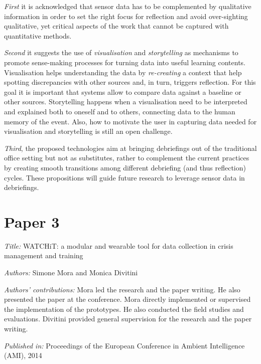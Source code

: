 \emph{First} it is acknowledged that sensor data has to be complemented by qualitative information in order to set the right focus for reflection and avoid over-sighting qualitative, yet critical aspects of the work that cannot be captured with quantitative methods.

\emph{Second} it suggests the use of \emph{visualisation} and \emph{storytelling} as mechanisms to promote sense-making processes for turning data into useful learning contents. Visualisation helps understanding the data by \emph{re-creating} a context that help spotting discrepancies with other sources and, in turn, triggers reflection. For this goal it is important that systems allow to compare data against a baseline or other sources. Storytelling happens when a visualisation need to be interpreted and explained both to oneself and to others, connecting data to the human memory of the event. Also, how to motivate the user in capturing data needed for visualisation and storytelling is still an open challenge.

\emph{Third}, the proposed technologies aim at bringing debriefings out of the traditional office setting but not as substitutes, rather to complement the current practices by creating smooth transitions among different debriefing (and thus reflection) cycles. These propositions will guide future research to leverage sensor data in debriefings.


\section[P3: WATCHiT: a modular and wearable tool for data collection in crisis management and training]{Paper 3}\label{paper-3}

\emph{Title:} WATCHiT: a modular and wearable tool for data collection in crisis management and training

\emph{Authors:} Simone Mora and Monica Divitini

\emph{Authors' contributions:} Mora led the research and the paper writing. He also presented the paper at the conference. Mora directly implemented or supervised the implementation of the prototypes. He also conducted the field studies and evaluations. Divitini provided general supervision for the research and the paper writing.

\emph{Published in:} Proceedings of the European Conference in Ambient Intelligence (AMI), 2014 

